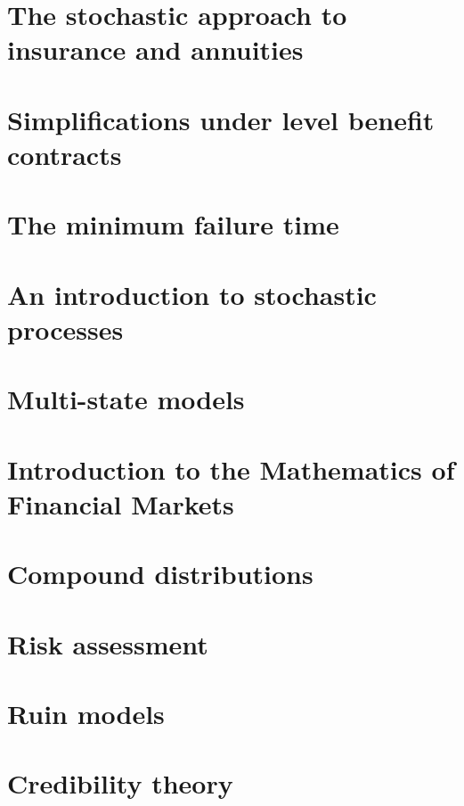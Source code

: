 \documentclass{article}
\begin{document}
\section{The stochastic approach to insurance and annuities}
\section{Simplifications under level benefit contracts}
\section{The minimum failure time}
\section{An introduction to stochastic processes}
\section{Multi-state models}
\section{Introduction to the Mathematics of Financial Markets}
\section{Compound distributions}
\section{Risk assessment}
\section{Ruin models}
\section{Credibility theory}
\end{document}
